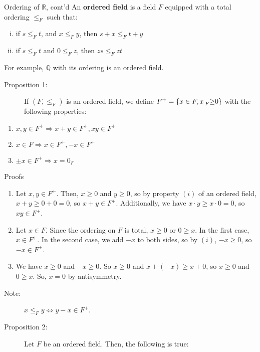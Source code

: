 \documentclass[8pt]{extarticle}
\newcommand{\Q}{\mathbb{Q}}
\newcommand{\R}{\mathbb{R}}
\begin{document}
  \begin{problem}{Ordering of $\R$, cont'd}
    An \textbf{ordered field} is a field $F$ equipped with a total ordering $\leq_{F}$ such that:
    \begin{enumerate}[(i)]
      \item if $s\leq_{F} t$, and $x\leq_{F} y$, then $s + x \leq_{F} t + y$
      \item if $s\leq_{F} t$ and $0\leq_{F} z$, then $zs\leq_{F} zt$
    \end{enumerate}
    For example, $\Q$ with its ordering is an ordered field.\\
    \begin{description}
      \item[Proposition 1:] If $(F,\leq_F)$ is an ordered field, we define $F^+ = \{x\in F,x\prescript{}{F}\geq 0\}$ with the following properties:
    \end{description}
    \begin{enumerate}[(1)]
      \item $x,y\in F^+ \Rightarrow x+y\in F^+,xy\in F^+$
      \item $x\in F \Rightarrow x\in F^+,-x\in F^+$
      \item $\pm x\in F^+ \Rightarrow x = 0_F$
    \end{enumerate}
    \begin{problem}{Proofs}
      \begin{enumerate}[(1)]
        \item Let $x,y\in F^+$. Then, $x\geq 0$  and $y\geq 0$, so by property $(i)$ of an ordered field, $x+y\geq 0+0 = 0$, so $x+y\in F^+$. Additionally, we have $x\cdot y \geq x\cdot 0 = 0$, so $xy \in F^+$.
        \item Let $x\in F$. Since the ordering on $F$ is total, $x \geq 0$ or $0\geq x$. In the first case, $x\in F^+$. In the second case, we add $-x$ to both sides, so by $(i)$, $-x\geq 0$, so $-x\in F^+$.
        \item We have $x\geq 0$  and $-x\geq 0$. So $x \geq 0$ and $x + (-x) \geq x+0$, so $x\geq 0$ and $0\geq x$. So, $x = 0$ by antisymmetry.
      \end{enumerate}
    \end{problem}
    \begin{description}
      \item[Note:] $x\leq_F y \Leftrightarrow y-x\in F^+$.
    \end{description}
    \begin{description}
      \item[Proposition 2:] Let $F$ be an ordered field. Then, the following is true:

\end{description}
\end{problem}
\end{document}
